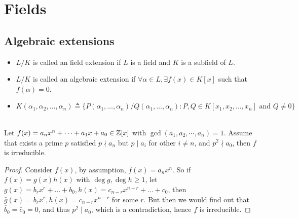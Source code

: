 \section{Fields}

\subsection{Algebraic extensions}

\begin{definition} \hfill
  \begin{itemize}
    \item $L / K$ is called an field extension if $L$ is a field and $K$ is a subfield of $L$.
    \item $L / K$ is called an algebraic extension if $\forall \alpha \in L, \exists f(x) \in K[x]$
      such that $f(\alpha) = 0$.
    \item $K(\alpha_1, \alpha_2, \dots, \alpha_n) \triangleq \big\{ P(\alpha_1, \dots, \alpha_n)
      / Q(\alpha_1, \dots, \alpha_n) : P, Q \in K[x_1, x_2, \dots, x_n] \text{ and } Q \neq 0 \big\}$
  \end{itemize}
\end{definition}

\begin{theorem} \mbox{} \\
  Let $f(x) = a_n x^n + \dots + a_1 x + a_0 \in \mathbb{Z}[x]$ with $\gcd(a_1, a_2, \cdots, a_n) = 1$.
  Assume that exists a prime $p$ satisfied $p \nmid a_n$ but $p \mid a_i$ for other $i \neq n$,
  and $p^2 \nmid a_0$, then $f$ is irreducible.

  \begin{proof}
    Consider $\bar{f}(x)$, by assumption, $\bar{f}(x) = \bar{a}_n x^n$. So if $f(x) = g(x) h(x)$
    with $\deg g, \deg h \geq 1$, let $g(x) = b_r x^r + \dots + b_0, h(x) = c_{n-r} x^{n-r} + \dots + c_0$,
    then $\bar{g}(x) = \bar{b}_r x^r, \bar{h}(x) = \bar{c}_{n-r} x^{n-r}$ for some
    $r$. But then we would find out that $\bar{b}_0 = \bar{c}_0 = 0$, and thus $p^2 \mid a_0$,
    which is a contradiction, hence $f$ is irreducible.
  \end{proof}
\end{theorem}

